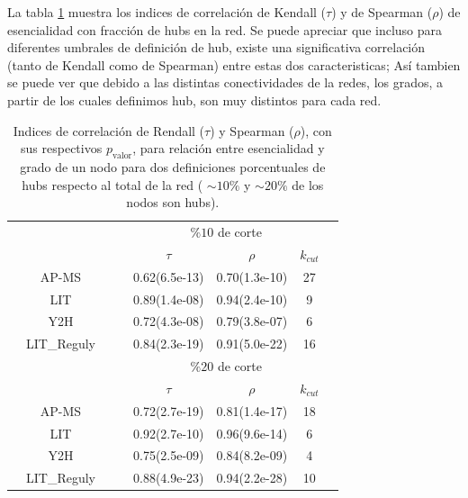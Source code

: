 La tabla \ref{tab:cl} muestra los indices de correlaci\'on de Kendall ($\tau$) y de Spearman ($\rho$) de esencialidad con fracci\'on de hubs en la red. Se puede apreciar que incluso para diferentes umbrales de definici\'on de hub, existe una significativa
correlaci\'on (tanto de Kendall como de Spearman)
entre estas dos caracteristicas; As\'i tambien se puede ver que debido a las distintas conectividades de la redes, los grados, 
a partir de los cuales definimos hub, son muy distintos para cada red.


\begin{table}[!ht]
    \centering
    \caption{\label{tab:cl}Indices de correlaci\'on de Rendall ($\tau$) y Spearman ($\rho$), con sus respectivos $p_\text{valor}$, para relaci\'on entre esencialidad y 
grado de un nodo para dos definiciones porcentuales de hubs respecto al total de la red ( $\sim10\%$ y $\sim20\%$ de los nodos son hubs).}
    {\scriptsize
    \begin{tabularx}{.8\columnwidth}{XcX|XcccX}
        \hline\hline
        &               &&& \multicolumn{3}{c}{$\% 10$ de corte }             \\ 
        \cline{5-7}
        &               &&& $\tau$ &        $\rho$          & $k_{cut}$     \\
        \hline
        & AP-MS         &&& 0.62(6.5e-13) & 0.70(1.3e-10) & 27           \\ 
        & LIT           &&& 0.89(1.4e-08) & 0.94(2.4e-10) & 9             \\
        & Y2H           &&& 0.72(4.3e-08) & 0.79(3.8e-07) & 6             \\
        & LIT\_Reguly   &&& 0.84(2.3e-19)   & 0.91(5.0e-22) & 16          \\
        \hline
        &               &&& \multicolumn{3}{c}{$\% 20$ de corte} & \\
        \cline{5-7}
        &               &&& $\tau$        & $\rho$ & $k_{cut}$ &  \\
        \hline
        & AP-MS         &&&0.72(2.7e-19) & 0.81(1.4e-17) & 18 \\
        & LIT           &&&0.92(2.7e-10) & 0.96(9.6e-14) & 6  \\
        & Y2H           &&&0.75(2.5e-09) & 0.84(8.2e-09) & 4  \\
        & LIT\_Reguly   &&&0.88(4.9e-23) & 0.94(2.2e-28) & 10  \\
        \hline\hline
    \end{tabularx}
    }
\end{table}
